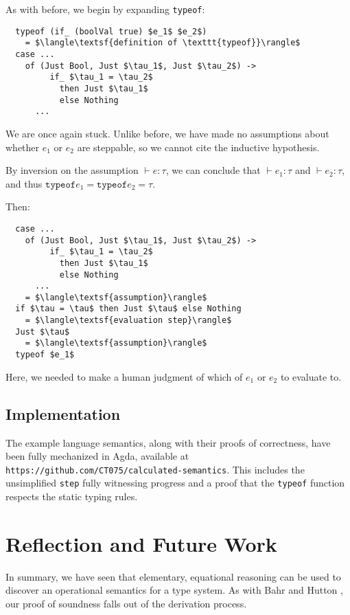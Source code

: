 \documentclass[manuscript,screen,sigplan]{acmart}
\begin{document}
As with before, we begin by expanding \texttt{typeof}:

\begin{lstlisting}
  typeof (if_ (boolVal true) $e_1$ $e_2$)
    = $\langle\textsf{definition of \texttt{typeof}}\rangle$
  case ...
    of (Just Bool, Just $\tau_1$, Just $\tau_2$) ->
         if_ $\tau_1 = \tau_2$
           then Just $\tau_1$
           else Nothing
      ...
\end{lstlisting}

We are once again stuck. Unlike before, we have made no assumptions about
whether $e_1$ or $e_2$ are steppable, so we cannot cite the inductive
hypothesis.

By inversion on the assumption $\vdash e : \tau$, we
can conclude that $\vdash e_1 : \tau$ and $\vdash e_2: \tau$, and thus
$\texttt{typeof} e_1 = \texttt{typeof} e_2 = \tau$.

Then:

\begin{lstlisting}
  case ...
    of (Just Bool, Just $\tau_1$, Just $\tau_2$) ->
         if_ $\tau_1 = \tau_2$
           then Just $\tau_1$
           else Nothing
      ...
    = $\langle\textsf{assumption}\rangle$
  if $\tau = \tau$ then Just $\tau$ else Nothing
    = $\langle\textsf{evaluation step}\rangle$
  Just $\tau$
    = $\langle\textsf{assumption}\rangle$
  typeof $e_1$
\end{lstlisting}

Here, we needed to make a human judgment of which of $e_1$ or $e_2$ to evaluate
to.

\subsection{Implementation}

The example language semantics, along with their proofs of correctness, have
been fully mechanized in Agda, available at \texttt{https://github.com/CT075/calculated-semantics}.
This includes the unsimplified \texttt{step} fully witnessing progress and a
proof that the \texttt{typeof} function respects the static typing rules.

\section{Reflection and Future Work}

In summary, we have seen that elementary, equational reasoning can be used to
discover an operational semantics for a type system. As with Bahr and Hutton
\cite{bahr:2015}, our proof of soundness falls out of the derivation process.
\end{document}
